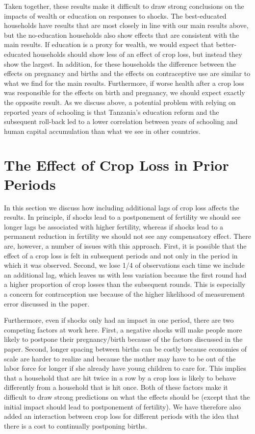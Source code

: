 \documentclass[letterpaper,12pt]{article}
\begin{document}
Taken together, these results make it difficult to draw strong
conclusions on the impacts of wealth or education on responses to shocks.
The best-educated households have results that are
most closely in line with our main results above, but 
the no-education households also show effects that are
consistent with the main results.
If education is a proxy for wealth, we would 
expect that better-educated households should show less
of an effect of crop loss, but instead they show the largest.
In addition, for these households the difference between
the effects on pregnancy and births and the effects on
contraceptive use are similar to what we find for the main results.
Furthermore, if worse health after a crop loss was responsible for the
effects on birth and pregnancy, we should expect exactly
the opposite result.
As we discuss above, a potential problem with relying on 
reported years of schooling is that Tanzania's education reform and the
subsequent roll-back led to a lower correlation between years of
schooling and human capital accumulation than what we see in other
countries.

\section{The Effect of Crop Loss in Prior Periods}

In this section we discuss how including additional lags
of crop loss affects the results.
In principle, if shocks lead to a postponement of fertility we 
should see longer lags be associated with higher fertility, 
whereas if shocks lead to a permanent reduction in fertility we
should not see any compensatory effect.
There are, however, a number of issues with this approach.
First, it is possible that the effect of a crop loss is felt
in subsequent periods and not only in the period in which it
was observed.
Second, we lose 1/4 of observations each time we include an 
additional lag, which leaves us with less variation because
the first round had a higher proportion of crop losses than
the subsequent rounds.
This is especially a concern for contraception use because
of the higher likelihood of measurement error discussed in the
paper.

Furthermore, even if shocks only had an impact in one period, 
there are two competing factors at work here.
First, a negative shocks will make people more likely to postpone 
their pregnancy/birth because of the factors discussed in the
paper.
Second, longer spacing between births can be costly because economies
of scale are harder to realize and because the mother may have to 
be out of the labor force for longer if she already have young
children to care for.
This implies that a household that are hit twice in a row by
a crop loss is likely to behave differently from a household that
is hit once.
Both of these factors make it difficult to draw strong 
predictions on what the effects should be (except that the
initial impact should lead to postponement of fertility).
We have therefore also added an interaction between crop loss for 
different periods with the idea that there is a cost to continually 
postponing births. 
\end{document}
